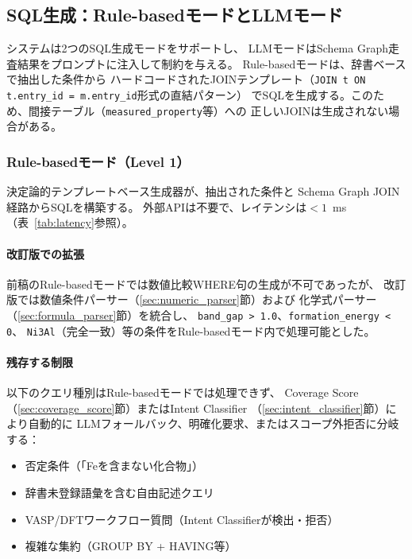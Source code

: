 \documentclass[5p,twocolumn]{elsarticle}
\begin{document}
\subsection{SQL生成：Rule-basedモードとLLMモード}
\label{sec:sql_generation}

システムは2つのSQL生成モードをサポートし、
LLMモードはSchema Graph走査結果をプロンプトに注入して制約を与える。
Rule-basedモードは、辞書ベースで抽出した条件から
ハードコードされたJOINテンプレート（\texttt{JOIN t ON t.entry\_id = m.entry\_id}形式の直結パターン）
でSQLを生成する。このため、間接テーブル（\texttt{measured\_property}等）への
正しいJOINは生成されない場合がある。

\subsubsection{Rule-basedモード（Level 1）}

決定論的テンプレートベース生成器が、抽出された条件と
Schema Graph JOIN経路からSQLを構築する。
外部APIは不要で、レイテンシは$< 1$~ms（表~\ref{tab:latency}参照）。

\paragraph{改訂版での拡張}
前稿のRule-basedモードでは数値比較WHERE句の生成が不可であったが、
改訂版では数値条件パーサー（\ref{sec:numeric_parser}節）および
化学式パーサー（\ref{sec:formula_parser}節）を統合し、
\texttt{band\_gap > 1.0}、\texttt{formation\_energy < 0}、
\texttt{Ni3Al}（完全一致）等の条件をRule-basedモード内で処理可能とした。

\paragraph{残存する制限}
以下のクエリ種別はRule-basedモードでは処理できず、
Coverage Score（\ref{sec:coverage_score}節）またはIntent Classifier
（\ref{sec:intent_classifier}節）により自動的に
LLMフォールバック、明確化要求、またはスコープ外拒否に分岐する：

\begin{itemize}
  \item 否定条件（「Feを含まない化合物」）
  \item 辞書未登録語彙を含む自由記述クエリ
  \item VASP/DFTワークフロー質問（Intent Classifierが検出・拒否）
  \item 複雑な集約（GROUP BY + HAVING等）
\end{itemize}
\end{document}
